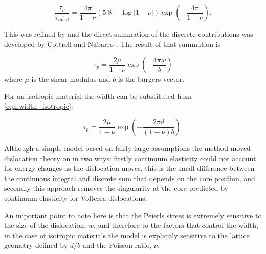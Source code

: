 \begin{equation}
\frac{\tau_p}{\tau_{ideal}} = \frac{4 \pi}{1 - \nu} (5.8 - \log|1-\nu|) \exp\left(-\frac{4\pi}{1 - \nu}\right).
\end{equation}

This was refined by \citet{Nabarro1947} and the direct summation of the discrete contributions was developed by Cottrell and Nabarro \cite{cottrell1953dislocations}. The result of that summation is



\begin{equation}
\tau_p = \frac{2\mu}{1-\nu} \exp\left( - \frac{4\pi w}{b} \right)
\end{equation}
where $\mu$ is the shear modulus and $b$ is the burgers vector.

For an isotropic material the width can be substituted from \autoref{eqn:width_isotropic}:

\begin{equation}
\tau_p = \frac{2\mu}{1-\nu} \exp\left( - \frac{2\pi d}{(1-\nu)b} \right).
\end{equation}

Although a simple model based on fairly large assumptions the method moved dislocation theory on in two ways: firstly continuum elasticity could not account for energy changes as the dislocation moves, this is the small difference between the continuous integral and discrete sum that depends on the core position, and secondly this approach removes the singularity at the core predicted by continuum elasticity for Volterra dislocations.


An important point to note here is that the Peierls stress is extremely sensitive to the size of the dislocation, $w$, and therefore to the factors that control the width; in the case of isotropic materials the model is explicitly sensitive to the lattice geometry defined by $d/b$ and the Poisson ratio, $\nu$.



